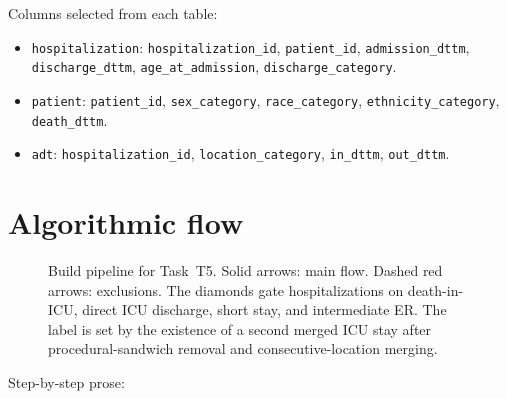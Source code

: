 \documentclass[11pt]{article}
\begin{document}
Columns selected from each table:
\begin{itemize}[leftmargin=2em, itemsep=0pt]
  \item \texttt{hospitalization}: \texttt{hospitalization\_id},
        \texttt{patient\_id}, \texttt{admission\_dttm},
        \texttt{discharge\_dttm}, \texttt{age\_at\_admission},
        \texttt{discharge\_category}.
  \item \texttt{patient}: \texttt{patient\_id}, \texttt{sex\_category},
        \texttt{race\_category}, \texttt{ethnicity\_category},
        \texttt{death\_dttm}.
  \item \texttt{adt}: \texttt{hospitalization\_id},
        \texttt{location\_category}, \texttt{in\_dttm}, \texttt{out\_dttm}.
\end{itemize}

\section{Algorithmic flow}
\label{sec:flow}

\begin{figure}[H]
\centering
\resizebox{\textwidth}{!}{}
\caption{Build pipeline for Task~T5. Solid arrows: main flow. Dashed red
arrows: exclusions. The diamonds gate hospitalizations on death-in-ICU,
direct ICU discharge, short stay, and intermediate ER. The label is set by
the existence of a second merged ICU stay after procedural-sandwich removal
and consecutive-location merging.}
\label{fig:readmit-flow}
\end{figure}

Step-by-step prose:
\end{document}
